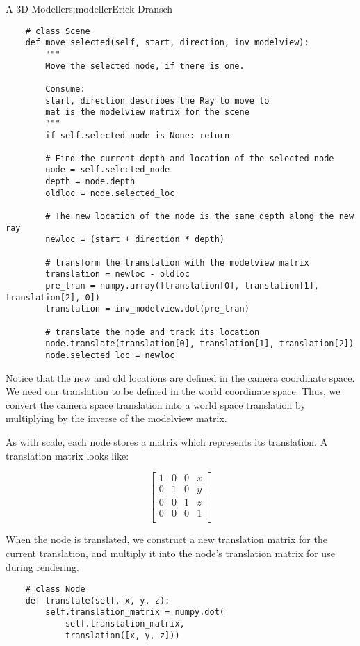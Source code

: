\begin{aosachapter}{A 3D Modeller}{s:modeller}{Erick Dransch}
\begin{verbatim}
    # class Scene
    def move_selected(self, start, direction, inv_modelview):
        """ 
        Move the selected node, if there is one.
            
        Consume: 
        start, direction describes the Ray to move to
        mat is the modelview matrix for the scene 
        """
        if self.selected_node is None: return
    
        # Find the current depth and location of the selected node
        node = self.selected_node
        depth = node.depth
        oldloc = node.selected_loc
    
        # The new location of the node is the same depth along the new ray
        newloc = (start + direction * depth)
    
        # transform the translation with the modelview matrix
        translation = newloc - oldloc
        pre_tran = numpy.array([translation[0], translation[1], translation[2], 0])
        translation = inv_modelview.dot(pre_tran)
    
        # translate the node and track its location
        node.translate(translation[0], translation[1], translation[2])
        node.selected_loc = newloc
\end{verbatim}

Notice that the new and old locations are defined in the camera
coordinate space. We need our translation to be defined in the world
coordinate space. Thus, we convert the camera space translation into a
world space translation by multiplying by the inverse of the modelview
matrix.

As with scale, each node stores a matrix which represents its
translation. A translation matrix looks like:

\[
   \begin{bmatrix}
   1 & 0 & 0 & x \\
   0 & 1 & 0 & y \\
   0 & 0 & 1 & z \\
   0 & 0 & 0 & 1 \\
   \end{bmatrix}
\]

When the node is translated, we construct a new translation matrix for
the current translation, and multiply it into the node's translation
matrix for use during rendering.

\begin{verbatim}
    # class Node
    def translate(self, x, y, z):
        self.translation_matrix = numpy.dot(
            self.translation_matrix, 
            translation([x, y, z]))
\end{verbatim}


\end{aosachapter}
